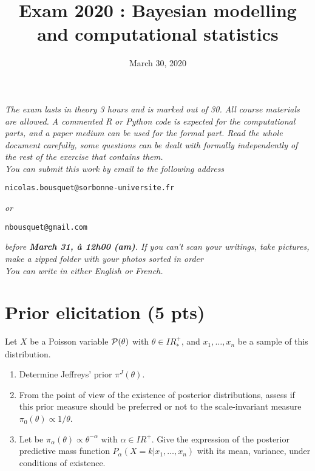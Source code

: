 \documentclass[10pt]{article}
\title{Exam 2020 : Bayesian modelling and computational statistics  }
\date{March 30, 2020}
\newcommand{\R}{I\!\!R}
\newcommand{\E}{\mbox{E}}
\newcommand{\V}{\mbox{Var}}
\newcommand{\1}{\mathbbm{1}}
\begin{document}
\maketitle

 




{\it The exam lasts in theory 3 hours and is marked out of 30. All course materials are allowed. A commented R or Python code is expected for the computational parts, and a paper medium can be used for the formal part. Read the whole document carefully, some questions can be dealt with formally independently of the rest of the exercise that contains them.} \\

{\it You can submit this work by email to the following address} 
\begin{center}
 \texttt{nicolas.bousquet@sorbonne-universite.fr} 
 \end{center} 
{\it or }
 \begin{center}
 \texttt{nbousquet@gmail.com} 
  \end{center} 
{\it before {\bf March 31, à 12h00 (am)}. If you can't scan your writings, take pictures, make a zipped folder with your photos sorted in order} \\

 {\it You can write in either English or French.} \\ 


\section{Prior elicitation (5 pts)}

Let $X$ be a Poisson variable ${\cal{P}}(\theta)$ with $\theta\in\R^+_*$, and $x_1,\ldots,x_n$ be a sample of this distribution.
\begin{enumerate}
\item Determine Jeffreys' prior $\pi^J(\theta)$.
\item From the point of view of the existence of posterior distributions, assess if this prior measure should be preferred or not to  the scale-invariant measure $\pi_0(\theta)\propto1/\theta$.
\item Let be $\pi_{\alpha}(\theta) \propto \theta^{-\alpha}$ with $\alpha\in\R^+$. Give the expression of the posterior predictive mass function  $P_{\alpha}(X=k|x_1,\ldots,x_n)$ with its mean, variance, under conditions of existence.
\end{enumerate}
\end{document}
